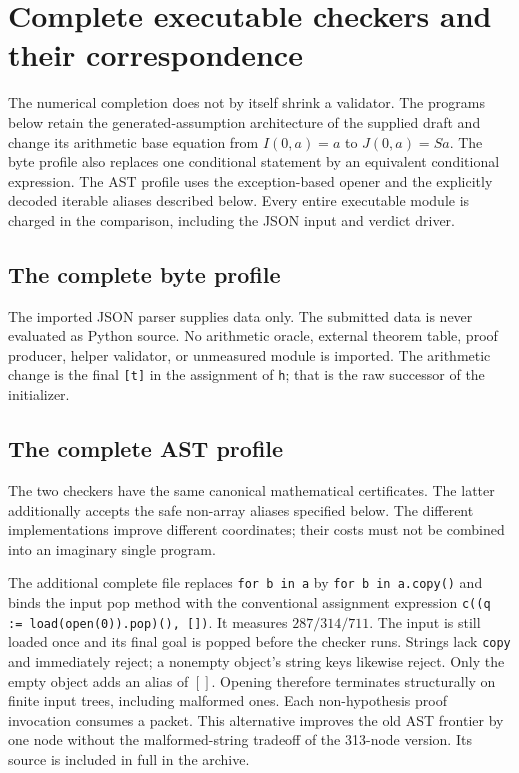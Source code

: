 \clearpage
\section{Complete executable checkers and their correspondence}
\label{sec:implementation}

The numerical completion does not by itself shrink a validator. The
programs below retain the generated-assumption architecture of the
supplied draft and change its arithmetic base equation from $I(0,a)=a$
to $J(0,a)=Sa$. The byte profile also replaces one conditional statement
by an equivalent conditional expression. The AST profile uses the
exception-based opener and the explicitly decoded iterable aliases
described below. Every entire executable module is charged in the
comparison, including the JSON input and verdict driver.

\subsection{The complete byte profile}

The imported JSON parser supplies data only. The submitted data is never
evaluated as Python source. No arithmetic oracle, external theorem table,
proof producer, helper validator, or unmeasured module is imported.
The arithmetic change is the final \texttt{[t]} in the assignment of
\texttt{h}; that is the raw successor of the initializer.

\subsection{The complete AST profile}

The two checkers have the same canonical mathematical certificates.
The latter additionally accepts the safe non-array aliases specified
below. The different implementations improve different coordinates;
their costs must not be combined into an imaginary single program.

The additional complete file  replaces
\texttt{for b in a} by \texttt{for b in a.copy()} and binds the input
pop method with the conventional assignment expression
\texttt{c((q := load(open(0)).pop)(), [])}. It measures $287/314/711$.
The input is still loaded once and its final goal is popped before the
checker runs. Strings lack \texttt{copy} and immediately reject; a
nonempty object's string keys likewise reject. Only the empty object
adds an alias of $[]$. Opening therefore terminates structurally on
finite input trees, including malformed ones. Each non-hypothesis proof
invocation consumes a packet. This alternative improves the old AST
frontier by one node without the malformed-string tradeoff of the
313-node version. Its source is included in full in the archive.

